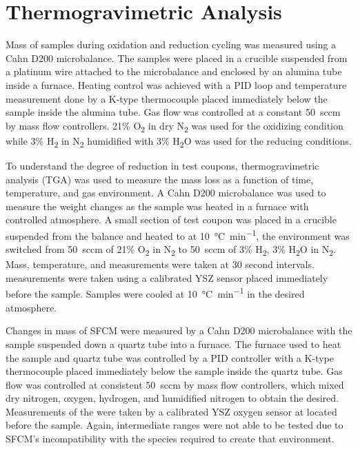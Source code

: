 \section{Thermogravimetric Analysis}
    Mass of samples during oxidation and reduction cycling was measured using a Cahn D200 microbalance.
    The samples were placed in a crucible suspended from a platinum wire attached to the microbalance and enclosed by an alumina tube inside a furnace.
    Heating control was achieved with a PID loop and temperature measurement done by a K-type thermocouple placed immediately below the sample inside the alumina tube.
    Gas flow was controlled at a constant \SI{50}{sccm} by mass flow controllers.
    21\% O\textsubscript{2} in dry N\textsubscript{2} was used for the oxidizing condition while 3\% H\textsubscript{2} in N\textsubscript{2} humidified with 3\% H\textsubscript{2}O was used for the reducing conditions.

    To understand the degree of reduction in test coupons, thermogravimetric analysis (TGA) was used to measure the mass loss as a function of time,
    temperature, and gas environment.
    A Cahn D200 microbalance was used to measure the weight changes as the sample was heated in a furnace with controlled atmosphere.
    A small section of test coupon was placed in a crucible suspended from the balance and heated to  at \SI{10}{\celsius\per\minute}, the environment was switched from \SI{50}{sccm} of 21\% O\textsubscript{2} in
    N\textsubscript{2} to \SI{50}{sccm} of 3\% H\textsubscript{2}, 3\%
    H\textsubscript{2}O in N\textsubscript{2}.
    Mass, temperature, and
     measurements were taken at 30 second intervals.
     measurements were taken using a calibrated YSZ sensor placed immediately before the sample.
    Samples were cooled at \SI{10}{\celsius\per\minute} in the desired atmosphere.

    Changes in mass of SFCM were measured by a Cahn D200 microbalance with the sample suspended down a quartz tube into a furnace.
    The furnace used to heat the sample and quartz tube was controlled by a PID controller with a K-type thermocouple placed immediately below the sample inside the quartz tube.
    Gas flow was controlled at consistent \SI{50}{sccm} by mass flow controllers, which mixed dry nitrogen, oxygen, hydrogen, and humidified nitrogen to obtain the  desired.
    Measurements of the  were taken by a calibrated YSZ oxygen sensor at  located before the sample.
    Again, intermediate  ranges were not able to be tested due to SFCM's incompatibility with the species required to create that environment.


